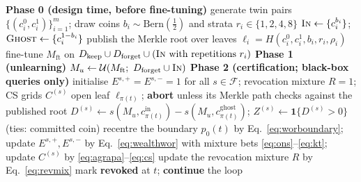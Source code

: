 \documentclass[pdflatex,sn-mathphys-num]{sn-jnl}
\theoremstyle{thmstyleone}
\theoremstyle{thmstyletwo}
\theoremstyle{thmstylethree}
\newcommand{\F}{\mathcal{F}}
\newcommand{\Ucal}{\mathcal{U}}
\newcommand{\Bern}{\mathrm{Bern}}
\newcommand{\eps}{\varepsilon}
\providecommand{\DIFaddbegin}{} %
\providecommand{\DIFdelend}{} %
\newcommand{\DIFaddincludegraphics}[2][]{{\color{blue}\fbox{\DIFOincludegraphics[#1]{#2}}}} %
\DeclareRobustCommand{\DIFaddbegin}{\DIFOaddbegin \let\includegraphics\DIFaddincludegraphics} %
\DeclareRobustCommand{\DIFdelend}{\DIFOaddend \let\includegraphics\DIFOincludegraphics} %
\begin{document}
\begin{algorithm}[t]
\DIFdelend \DIFaddbegin \begin{algorithmic}[1]
\Statex \textbf{Phase 0 (design time, before fine-tuning)}
\State generate twin pairs $\{(c_i^0, c_i^1)\}_{i=1}^m$; draw coins
       $b_i \sim \Bern(\tfrac12)$ and strata $r_i \in \{1,2,4,8\}$
\State $\textsc{In} \gets \{c_i^{b_i}\}$;\quad $\textsc{Ghost} \gets \{c_i^{1-b_i}\}$
\State publish the Merkle root over leaves
       $\ell_i = H(c_i^0, c_i^1, b_i, r_i, \rho_i)$
\State fine-tune $M_{\mathrm{ft}}$ on $D_{\text{keep}} \cup D_{\text{forget}} \cup
       (\textsc{In} \text{ with repetitions } r_i)$
\Statex \textbf{Phase 1 (unlearning)}
\State $M_u \gets \Ucal(M_{\mathrm{ft}};\ D_{\text{forget}} \cup \textsc{In})$
\Statex \textbf{Phase 2 (certification; black-box queries only)}
\State initialise $E^{s,+} = E^{s,-} = 1$ for all $s \in \F$; revocation mixture
       $R = 1$; CS grids $C^{(s)}$
  \State open leaf $\ell_{\pi(t)}$; \textbf{abort} unless its Merkle path checks
         against the published root
  \For{$s \in \F$}
     \State $D^{(s)} \gets s(M_u, c^{\text{in}}_{\pi(t)}) -
            s(M_u, c^{\text{ghost}}_{\pi(t)})$;\quad
            $Z^{(s)} \gets \mathbf{1}\{D^{(s)} > 0\}$ (ties: committed coin)
     \State recentre the boundary $p_0(t)$ by Eq.~\eqref{eq:worboundary}; update
            $E^{s,+}, E^{s,-}$ by Eq.~\eqref{eq:wealthwor} with mixture bets
            \eqref{eq:ons}--\eqref{eq:kt}; update $C^{(s)}$ by
            \eqref{eq:agrapa}--\eqref{eq:cs}
  \EndFor
  \State update the revocation mixture $R$ by Eq.~\eqref{eq:revmix}
     \State mark \textbf{revoked} at $t$; \textbf{continue} the loop

\end{algorithmic}
\end{algorithm}
\end{document}
